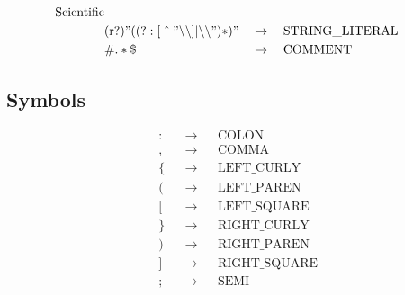 \documentclass[]{article}
\begin{document}
\begin{align}
\begin{aligned}[t]
                                                                                                   \text{Scientific}
                                                                                                   \end{aligned}                     \\
    &(\text{r}?)"((?:[\enspace\hat{}\enspace"\backslash\backslash]|\backslash\backslash")*)" &&\to \quad\text{STRING\_LITERAL}       \\
    &\#.*\$                                                                                  &&\to \quad\text{COMMENT}
\end{align}

\subsection{Symbols}
\begin{align}
    &:  &&\to &&\text{COLON}         \\
    &,  &&\to &&\text{COMMA}         \\
    &\{ &&\to &&\text{LEFT\_CURLY}   \\
    &(  &&\to &&\text{LEFT\_PAREN}   \\
    &[  &&\to &&\text{LEFT\_SQUARE}  \\
    &\} &&\to &&\text{RIGHT\_CURLY}  \\
    &)  &&\to &&\text{RIGHT\_PAREN}  \\
    &]  &&\to &&\text{RIGHT\_SQUARE} \\
    &;  &&\to &&\text{SEMI}
\end{align}
\end{document}
